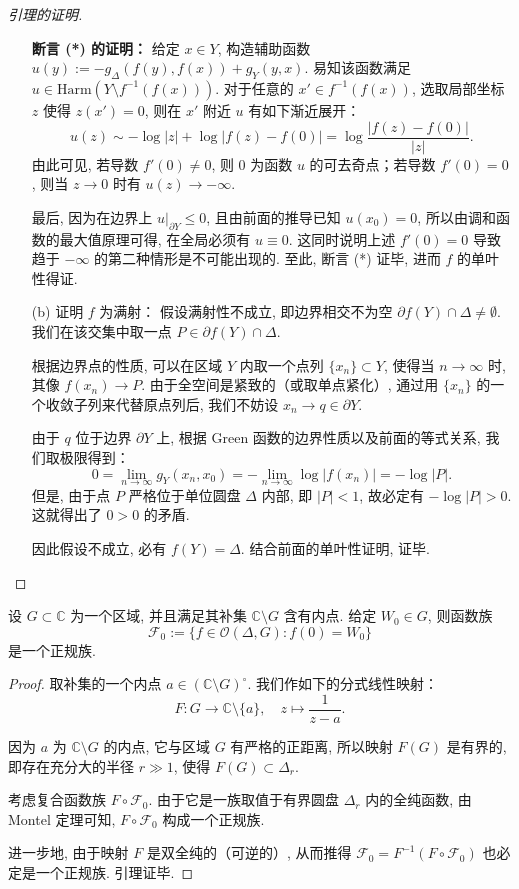 \begin{proof}[引理的证明]
\begin{itemize}
\qquad \textbf{断言 (*) 的证明：} 
给定 $x \in Y$, 构造辅助函数 $u(y) := -g_\Delta(f(y), f(x)) + g_Y(y, x)$. 易知该函数满足 $u \in \mathrm{Harm}(Y \setminus f^{-1}(f(x)))$. 对于任意的 $x' \in f^{-1}(f(x))$, 选取局部坐标 $z$ 使得 $z(x') = 0$, 则在 $x'$ 附近 $u$ 有如下渐近展开：
\[ u(z) \sim -\log|z| + \log|f(z) - f(0)| = \log \frac{|f(z) - f(0)|}{|z|}. \]
由此可见, 若导数 $f'(0) \neq 0$, 则 $0$ 为函数 $u$ 的可去奇点；若导数 $f'(0) = 0$, 则当 $z \to 0$ 时有 $u(z) \to -\infty$. 

\qquad 最后, 因为在边界上 $u|_{\partial Y} \leqslant 0$, 且由前面的推导已知 $u(x_0) = 0$, 所以由调和函数的最大值原理可得, 在全局必须有 $u \equiv 0$. 这同时说明上述 $f'(0) = 0$ 导致趋于 $-\infty$ 的第二种情形是不可能出现的. 至此, 断言 (*) 证毕, 进而 $f$ 的单叶性得证. 
\item [(b)]\qquad 证明 $f$ 为满射：
假设满射性不成立, 即边界相交不为空 $\partial f(Y) \cap \Delta \neq \emptyset$. 我们在该交集中取一点 $P \in \partial f(Y) \cap \Delta$. 

\qquad 根据边界点的性质, 可以在区域 $Y$ 内取一个点列 $\{x_n\} \subset Y$, 使得当 $n \to \infty$ 时, 其像 $f(x_n) \to P$. 由于全空间是紧致的（或取单点紧化）, 通过用 $\{x_n\}$ 的一个收敛子列来代替原点列后, 我们不妨设 $x_n \to q \in \partial Y$. 

\qquad 由于 $q$ 位于边界 $\partial Y$ 上, 根据 Green 函数的边界性质以及前面的等式关系, 我们取极限得到：
\[ 0 = \lim_{n \to \infty} g_Y(x_n, x_0) = -\lim_{n \to \infty} \log|f(x_n)| = -\log|P|. \]
但是, 由于点 $P$ 严格位于单位圆盘 $\Delta$ 内部, 即 $|P| < 1$, 故必定有 $-\log|P| > 0$. 这就得出了 $0 > 0$ 的矛盾. 

\qquad 因此假设不成立, 必有 $f(Y) = \Delta$. 结合前面的单叶性证明, 证毕. 
\end{itemize}
\end{proof}

\begin{lemma}\label{3.3.4}
设 $G \subset \mathbb{C}$ 为一个区域, 并且满足其补集 $\mathbb{C} \setminus G$ 含有内点. 给定 $W_0 \in G$, 则函数族
\[ \mathcal{F}_0 := \{f \in \mathcal{O}(\Delta, G) : f(0) = W_0\} \]
是一个正规族. 
\end{lemma}

\begin{proof}
取补集的一个内点 $a \in (\mathbb{C} \setminus G)^\circ$. 我们作如下的分式线性映射：
\[ F: G \to \mathbb{C} \setminus \{a\}, \quad z \mapsto \frac{1}{z-a}. \]

因为 $a$ 为 $\mathbb{C} \setminus G$ 的内点, 它与区域 $G$ 有严格的正距离, 所以映射 $F(G)$ 是有界的, 即存在充分大的半径 $r \gg 1$, 使得 $F(G) \subset \Delta_r$. 

考虑复合函数族 $F \circ \mathcal{F}_0$. 由于它是一族取值于有界圆盘 $\Delta_r$ 内的全纯函数, 由 Montel 定理可知, $F \circ \mathcal{F}_0$ 构成一个正规族. 

进一步地, 由于映射 $F$ 是双全纯的（可逆的）, 从而推得 $\mathcal{F}_0 = F^{-1}(F \circ \mathcal{F}_0)$ 也必定是一个正规族. 引理证毕. 
\end{proof}

